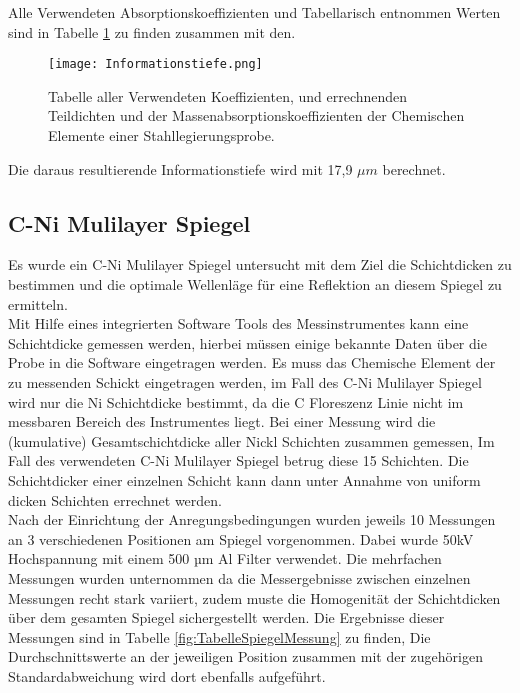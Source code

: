 Alle Verwendeten Absorptionskoeffizienten und Tabellarisch entnommen Werten sind in Tabelle \ref{fig:Intormationstiefe} zu finden zusammen mit den. 

\begin{figure}[h]
 \centering
 \texttt{[image: Informationstiefe.png]}
 \caption[Filter Tabelle]{Tabelle aller Verwendeten Koeffizienten, und errechnenden Teildichten und der Massenabsorptionskoeffizienten der Chemischen Elemente einer Stahllegierungsprobe.}
 \label{fig:Intormationstiefe}
\end{figure}

Die daraus resultierende Informationstiefe wird mit 17,9 $\mu m$ berechnet.

\subsection{C-Ni Mulilayer Spiegel}
Es wurde ein C-Ni Mulilayer Spiegel untersucht mit dem Ziel die Schichtdicken zu bestimmen und die optimale Wellenläge für eine Reflektion an diesem Spiegel zu ermitteln.\\

Mit Hilfe eines integrierten Software Tools des Messinstrumentes kann eine Schichtdicke gemessen werden, hierbei müssen einige bekannte Daten über die Probe in die Software eingetragen werden. Es muss das Chemische Element der zu messenden Schickt eingetragen werden, im Fall des C-Ni Mulilayer Spiegel wird nur die Ni Schichtdicke bestimmt, da die C Floreszenz Linie nicht im messbaren Bereich des Instrumentes liegt. Bei einer Messung wird die (kumulative) Gesamtschichtdicke aller Nickl Schichten zusammen gemessen, Im Fall des verwendeten C-Ni Mulilayer Spiegel betrug diese 15 Schichten. Die Schichtdicker einer einzelnen Schicht kann dann unter Annahme von uniform dicken Schichten errechnet werden. \\

Nach der Einrichtung der Anregungsbedingungen wurden jeweils 10 Messungen an 3 verschiedenen Positionen am Spiegel vorgenommen. Dabei wurde 50kV Hochspannung mit einem 500 µm Al Filter verwendet. Die mehrfachen Messungen wurden unternommen da die Messergebnisse zwischen einzelnen Messungen recht stark variiert, zudem muste die Homogenität der Schichtdicken über dem gesamten Spiegel sichergestellt werden.  Die Ergebnisse dieser Messungen sind in Tabelle \ref{fig:TabelleSpiegelMessung} zu finden, Die Durchschnittswerte an der jeweiligen Position zusammen mit der zugehörigen Standardabweichung wird dort ebenfalls aufgeführt. 

